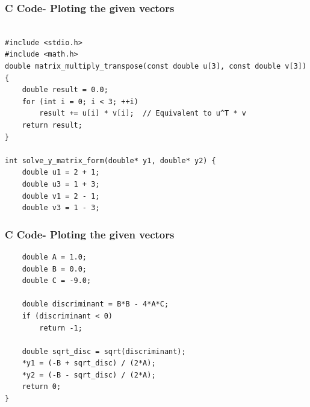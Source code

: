 \documentclass{beamer}
\begin{document}
	
	\begin{frame}[fragile]
	\frametitle{C Code- Ploting the given vectors}
	
	\begin{lstlisting}

#include <stdio.h>
#include <math.h>
double matrix_multiply_transpose(const double u[3], const double v[3]) {
    double result = 0.0;
    for (int i = 0; i < 3; ++i)
        result += u[i] * v[i];  // Equivalent to u^T * v
    return result;
}

int solve_y_matrix_form(double* y1, double* y2) {
    double u1 = 2 + 1;     
    double u3 = 1 + 3;     
    double v1 = 2 - 1;     
    double v3 = 1 - 3;     
	\end{lstlisting}
\end{frame}
\begin{frame}[fragile]
\frametitle{C Code- Ploting the given vectors}
    \begin{lstlisting}
    double A = 1.0;   
    double B = 0.0;
    double C = -9.0;

    double discriminant = B*B - 4*A*C;
    if (discriminant < 0)
        return -1;

    double sqrt_disc = sqrt(discriminant);
    *y1 = (-B + sqrt_disc) / (2*A);
    *y2 = (-B - sqrt_disc) / (2*A);
    return 0;
}
    \end{lstlisting}
\end{frame}
\end{document}
